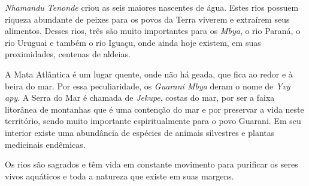 
 

 



\emph{Nhamandu Tenonde} criou as seis maiores nascentes de água. Estes
rios possuem riqueza abundante de peixes para os povos da Terra viverem
e extraírem seus alimentos. Desses rios, três são muito importantes para
os \emph{Mbya}, o rio Paraná, o rio Uruguai e também o rio Iguaçu, onde
ainda hoje existem, em suas proximidades, centenas de aldeias.

A Mata Atlântica é um lugar quente, onde não há geada, que fica ao redor
e à beira do mar. Por essa peculiaridade, os \emph{Guarani Mbya} deram o
nome de \emph{Yvy apy}. A Serra do Mar é chamada de \emph{Jekupe},
costas do mar, por ser a faixa litorânea de montanhas que é uma
contenção do mar e por preservar a vida neste território, sendo muito
importante espiritualmente para o povo Guarani. Em seu interior existe
uma abundância de espécies de animais silvestres e plantas medicinais
endêmicas.


 

Os rios são sagrados e têm vida em constante movimento para purificar os
seres vivos aquáticos e toda a natureza que existe em suas margens.

 
